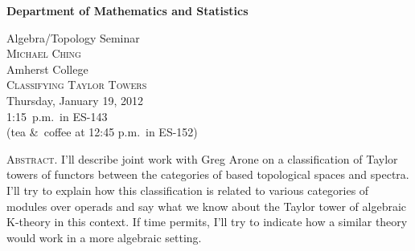 \documentclass[12pt]{article}
\begin{document}
\noindent\hspace{-28px}%
\hfill\textsf{\textbf{\footnotesize%
Department of Mathematics and Statistics}}\bigskip\bigskip

\begin{center}\Large
  \textsf{{\huge Algebra/Topology Seminar}}\\[2.5\bigskipamount]
  \textsc{Michael Ching}\\
  {\large Amherst College}\\[\bigskipamount]
  \textsc{Classifying Taylor Towers}\\[2\bigskipamount]
  Thursday, January 19, 2012\\ 1:15~p.m.\ in ES-143\\
  (tea \&\ coffee at 12:45 p.m.\ in ES-152)
\end{center}\bigskip\bigskip

\large\noindent\textsc{Abstract.}
I'll describe joint work with Greg Arone on a classification of Taylor towers of functors between the categories of based topological spaces and spectra. I'll try to explain how this classification is related to various categories of modules over operads and say what we know about the Taylor tower of algebraic K-theory in this context. If time permits, I'll try to indicate how a similar theory would work in a more algebraic setting.
\end{document}
